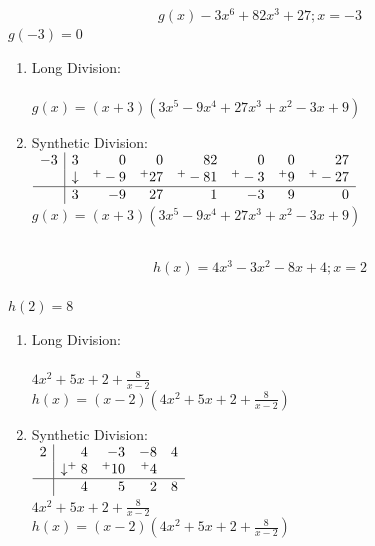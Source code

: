 \begin{example}
  $$g(x) - 3x^6 + 82x^3 + 27 ; x = -3$$
  $g(-3) = 0$
  \begin{enumerate}
  \item Long Division: \\
     \\
    $g(x) = (x + 3)(3x^5 - 9x^4 + 27x^3 + x^2 - 3x + 9)$
  \item Synthetic Division: \\
    $
    \begin{array}{c|rrrrrrr}
      -3 & 3 & 0 & 0 & 82 & 0 & 0 & 27 \\
      & \downarrow & ^+-9 & ^+27 & ^+-81 & ^+-3 & ^+9 & ^+-27 \\
      \hline
      & 3 & -9 & 27 & 1 & -3 & 9 & 0 \\
    \end{array}
    $ \\
    $g(x) = (x + 3) (3x^5 - 9x^4 + 27x^3 + x^2 - 3x + 9)$
  \end{enumerate}
\end{example}

\begin{example}
  \hfill \\
  $$h(x) = 4x^3 - 3x^2 - 8x + 4 ; x = 2$$ \\
  $h(2) = 8$
  \begin{enumerate}
  \item Long Division: \\
     \\
    $4x^2 + 5x + 2 + \frac{8}{x - 2}$ \\
    $h(x) = (x - 2)(4x^2 + 5x + 2 + \frac{8}{x - 2})$
  \item Synthetic Division: \\
    $
    \begin{array}{c|rrrr}
      2 & 4 & -3 & -8 & 4 \\
      & \downarrow ^+8 & ^+10 & ^+4 \\
      \hline
      & 4 & 5 & 2 & 8 \\
    \end{array}
    $ \\
    $4x^2 + 5x + 2 + \frac{8}{x - 2}$ \\
    $h(x) = (x - 2)(4x^2 + 5x + 2 + \frac{8}{x - 2})$
  \end{enumerate}
\end{example}

